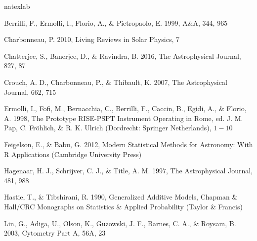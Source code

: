 \documentclass[manuscript]{aastex}	%
\begin{document}
\begin{thebibliography}{18}
\expandafter\ifx\csname natexlab\endcsname\relax\def\natexlab#1{#1}\fi

Berrilli, F., Ermolli, I., Florio, A., \& Pietropaolo, E. 1999, A\&A, 344, 965

Charbonneau, P. 2010, Living Reviews in Solar Physics, 7

Chatterjee, S., Banerjee, D., \& Ravindra, B. 2016, The Astrophysical Journal, 827, 87

Crouch, A. D., Charbonneau, P., \& Thibault, K. 2007, The Astrophysical Journal, 662, 715

Ermolli, I., Fofi, M., Bernacchia, C., Berrilli, F., Caccin, B., Egidi, A., \& Florio, A. 1998, The
Prototype RISE-PSPT Instrument Operating in Rome, ed. J. M. Pap, C. Fr{\"o}hlich, \& R. K.
Ulrich (Dordrecht: Springer Netherlands), $1-10$

Feigelson, E., \& Babu, G. 2012, Modern Statistical Methods for Astronomy: With R Applications (Cambridge University Press)  

Hagenaar, H. J., Schrijver, C. J., \& Title, A. M. 1997, The Astrophysical Journal, 481, 988

 Hastie, T., \& Tibshirani, R. 1990, Generalized Additive Models, Chapman \& Hall/CRC Monographs
on Statistics \& Applied Probability (Taylor \& Francis)

Lin, G., Adiga, U., Olson, K., Guzowski, J. F., Barnes, C. A., \& Roysam, B. 2003, Cytometry Part A, 56A, 23


\end{thebibliography}
\end{document}
